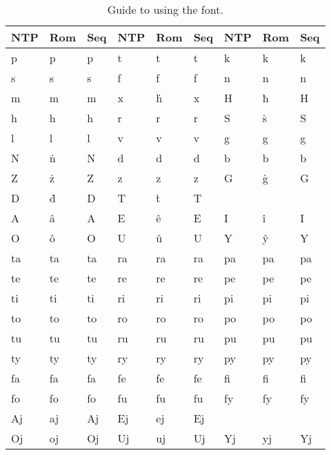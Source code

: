 \documentclass{book}
\begin{document}
\newcommand{\nrpair}[2]{#1 & #2 & #1}
\begin{table}[h]
  \caption{Guide to using the  font. \label{table:ntpmm}}
  \centering
  \begin{tabular}{|>{\dhrfont}l|l|>{\ttfamily}l||>{\dhrfont}l|l|>{\ttfamily}l||>{\dhrfont}l|l|>{\ttfamily}l|}
    \hline
    \textnormal{NTP} & Rom & \textnormal{Seq} &
    \textnormal{NTP} & Rom & \textnormal{Seq} &
    \textnormal{NTP} & Rom & \textnormal{Seq} \\
    \hline
    \nrpair{p}{p} &
    \nrpair{t}{t} &
    \nrpair{k}{k} \\
    \nrpair{s}{s} &
    \nrpair{f}{f} &
    \nrpair{n}{n} \\
    \nrpair{m}{m} &
    \nrpair{x}{ḣ} &
    \nrpair{H}{ħ} \\
    \nrpair{h}{h} &
    \nrpair{r}{r} &
    \nrpair{S}{ṡ} \\
    \nrpair{l}{l} &
    \nrpair{v}{v} &
    \nrpair{g}{g} \\
    \nrpair{N}{ṅ} &
    \nrpair{d}{d} &
    \nrpair{b}{b} \\
    \nrpair{Z}{ż} &
    \nrpair{z}{z} &
    \nrpair{G}{ġ} \\
    \nrpair{D}{ḋ} &
    \nrpair{T}{ṫ} &
    & & \\
    \hline
    \nrpair{A}{â} &
    \nrpair{E}{ê} &
    \nrpair{I}{î} \\
    \nrpair{O}{ô} &
    \nrpair{U}{û} &
    \nrpair{Y}{ŷ} \\
    \hline
    \nrpair{ta}{ta} &
    \nrpair{ra}{ra} &
    \nrpair{pa}{pa} \\
    \nrpair{te}{te} &
    \nrpair{re}{re} &
    \nrpair{pe}{pe} \\
    \nrpair{ti}{ti} &
    \nrpair{ri}{ri} &
    \nrpair{pi}{pi} \\
    \nrpair{to}{to} &
    \nrpair{ro}{ro} &
    \nrpair{po}{po} \\
    \nrpair{tu}{tu} &
    \nrpair{ru}{ru} &
    \nrpair{pu}{pu} \\
    \nrpair{ty}{ty} &
    \nrpair{ry}{ry} &
    \nrpair{py}{py} \\
    \nrpair{fa}{fa} &
    \nrpair{fe}{fe} &
    \nrpair{fi}{fi} \\
    \nrpair{fo}{fo} &
    \nrpair{fu}{fu} &
    \nrpair{fy}{fy} \\
    \hline
    \nrpair{Aj}{aj} &
    \nrpair{Ej}{ej} &
    & & \\
    \nrpair{Oj}{oj} &
    \nrpair{Uj}{uj} &
    \nrpair{Yj}{yj} \\

\end{tabular}
\end{table}
\end{document}
